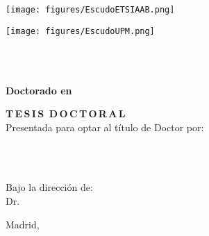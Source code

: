 
\begin{minipage}{0.20\textwidth}
        \texttt{[image: figures/EscudoETSIAAB.png]}   
\end{minipage}
\begin{minipage}{0.20\textwidth}
        \texttt{[image: figures/EscudoUPM.png]}
\end{minipage}
\begin{minipage}{0.65\textwidth} \centering
    {\UNIVERSITY}\\
    {\UPMCentre}\\
\end{minipage}

\vspace{15 mm}

\begin{center}
\begin{spacing}{1.5}
\textbf{\large {Doctorado en {\BachelorProgramme}}}\\
\end{spacing}
\vspace{10 mm}

\begin{spacing}{2.0}
\textbf{\LARGE {\thesisTitle}}
\end{spacing}

\vspace{15 mm}

\begin{spacing}{1.3}
\textbf{\LARGE {T\,E\,S\,I\,S\, D\,O\,C\,T\,O\,R\,A\,L}}\\
\medskip
{\large {Presentada para optar al título de Doctor por:}}
\end{spacing}
\end{center}


\begin{center}
\begin{spacing}{1.3}
\textbf{\Large {\thesisAuthor}}\\
{\large {\priorstudies}}\\
\end{spacing}
\end{center}

\vspace{5 mm}
\begin{center}
\begin{spacing}{1.3}
{Bajo la dirección de:}\\
    {\large {Dr. \supervisor}}\\
    {\large {\cosupervisor }}
\end{spacing}
\end{center}

\vspace{\fill}
\begin{center}
    \large {Madrid, \thesisDate}
\end{center}


